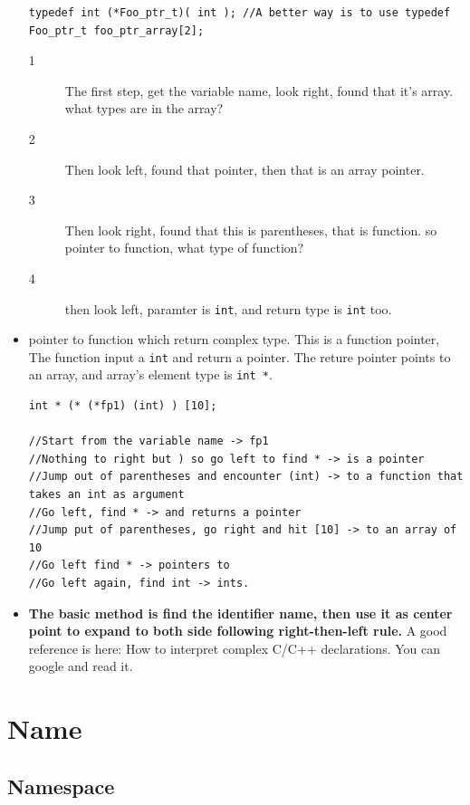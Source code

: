 \documentclass[a4paper,11pt,twoside]{book}
\begin{document}
\begin{itemize}
\begin{lstlisting}
typedef int (*Foo_ptr_t)( int ); //A better way is to use typedef
Foo_ptr_t foo_ptr_array[2];
\end{lstlisting}
	\begin{description}
		\item[1] The first step, get the variable name, look right, found that it's array. what types are in the array?
		\item[2] Then look left, found that pointer, then that is an array pointer.
		\item[3] Then look right, found that this is parentheses, that is function. so pointer to function, what type of function?
		\item[4] then look left, paramter is \texttt{int}, and return type is \texttt{int} too.
	\end{description}
	
	\item pointer to function which return complex type. This is a function pointer, The function input a \texttt{int} and return a pointer. The reture pointer points to an array, and array's element type is \texttt{int *}.
\begin{lstlisting}
int * (* (*fp1) (int) ) [10];

//Start from the variable name -> fp1
//Nothing to right but ) so go left to find * -> is a pointer
//Jump out of parentheses and encounter (int) -> to a function that takes an int as argument
//Go left, find * -> and returns a pointer
//Jump put of parentheses, go right and hit [10] -> to an array of 10
//Go left find * -> pointers to
//Go left again, find int -> ints.
\end{lstlisting}
	\item \textbf{The basic method is find the identifier name, then use it as center point to expand to both side following right-then-left rule.} A good reference is here: How to interpret complex C/C++ declarations. You can google and read it. 	
\end{itemize}

\section{Name}
\subsection{Namespace}
\end{document}
